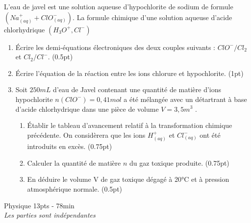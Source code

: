 \documentclass[12pt]{article}
\begin{document}
L’eau de javel est une solution aqueuse d’hypochlorite de sodium de formule $(Na^+_{(aq)} + ClO^-_{(aq)} )$.
La formule chimique d’une solution aqueuse d’acide chlorhydrique $(H_3O^+,Cl^-)$
\begin{enumerate}
  \item Écrire les demi-équations électroniques des deux couples suivants : $ClO^-/Cl_2$ et $Cl_2 /Cl^-$. \dotfill(0.5pt)
    
  \item  Écrire l’équation de la réaction entre les ions chlorure et hypochlorite. \dotfill(1pt)
  
  \item Soit $250mL$ d’eau de Javel contenant une quantité de matière d’ions hypochlorite $n(ClO^-)=0,41mol$ a été mélangée avec un détartrant à base d’acide chlorhydrique dans une pièce de volume $V=3,5 m^3$ .
    \begin{enumerate}
 \item Établir le tableau d’avancement relatif à la transformation chimique précédente. On considèrera que les ions $H^+_{(aq)}$ et $Cl^-_{(aq)}$ ont été introduits en excès. \dotfill(0.75pt)

 \item Calculer la quantité de matière $n$ du gaz toxique produite. \dotfill(0.75pt)
 \item En déduire le volume V de gaz toxique dégagé à 20°C et à pression atmosphérique normale. \dotfill(0.5pt)
   \end{enumerate}
\end{enumerate}

\begin{center}
\hrulefill
\Large{Physique 13pts - 78min}
\hrulefill\\
    \emph{Les parties sont indépendantes}
\end{center}
\end{document}

